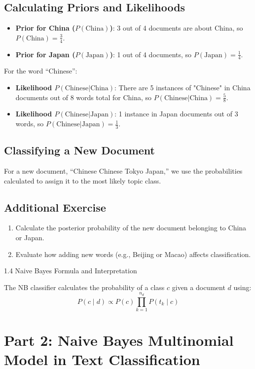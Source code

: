 \documentclass{article}
\begin{document}
\subsection*{Calculating Priors and Likelihoods}
\begin{itemize}
    \item \textbf{Prior for China ($P(\text{China})$)}: 3 out of 4 documents are about China, so $ P(\text{China}) = \frac{3}{4} $.
    \item \textbf{Prior for Japan ($P(\text{Japan})$)}: 1 out of 4 documents, so $ P(\text{Japan}) = \frac{1}{4} $.
\end{itemize}

For the word “Chinese”:
\begin{itemize}
    \item \textbf{Likelihood $P(\text{Chinese}|\text{China})$}: There are 5 instances of "Chinese" in China documents out of 8 words total for China, so $ P(\text{Chinese}|\text{China}) = \frac{5}{8} $.
    \item \textbf{Likelihood $P(\text{Chinese}|\text{Japan})$}: 1 instance in Japan documents out of 3 words, so $ P(\text{Chinese}|\text{Japan}) = \frac{1}{3} $.
\end{itemize}

\subsection*{Classifying a New Document}
For a new document, “Chinese Chinese Tokyo Japan,” we use the probabilities calculated to assign it to the most likely topic class.

\subsection*{Additional Exercise}
\begin{enumerate}
    \item Calculate the posterior probability of the new document belonging to China or Japan.
    \item Evaluate how adding new words (e.g., Beijing or Macao) affects classification.
\end{enumerate}
1.4 Naive Bayes Formula and Interpretation

The NB classifier calculates the probability of a class $c$ given a document $d$ using:
$$
P(c \mid d) \propto P(c) \prod_{k=1}^{n_d} P\left(t_k \mid c\right)
$$

\section*{Part 2: Naive Bayes Multinomial Model in Text Classification}
\end{document}
